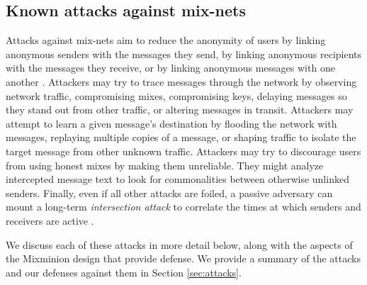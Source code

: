 \documentclass[11pt]{IEEEtran}
\begin{document}
\subsection{Known attacks against mix-nets}

Attacks against mix-nets aim to reduce the anonymity of users by
linking anonymous senders with the messages they send, by linking
anonymous recipients with the messages they receive, or by linking
anonymous messages with one another \cite{raymond00}.  Attackers may
try to trace messages through the network by observing network
traffic, compromising mixes, compromising keys, delaying messages
so they stand out from other traffic, or altering messages
in transit.  Attackers may attempt to learn a given message's destination
by flooding the network with messages, replaying multiple copies
of a message, or shaping traffic to isolate the target message from
other unknown traffic. Attackers may try to discourage users from
using honest mixes by making them unreliable. They might analyze
intercepted message text to look for commonalities between otherwise
unlinked senders.
Finally, even if all other attacks are foiled, a passive adversary can
mount a long-term \emph{intersection attack} to correlate the times at
which senders and receivers are active \cite{disad-free-routes}.

We discuss each of these attacks in more detail below, along with the
aspects of the Mixminion design that provide defense. We provide a summary
of the attacks and our defenses against them in Section \ref{sec:attacks}.



\end{document}
